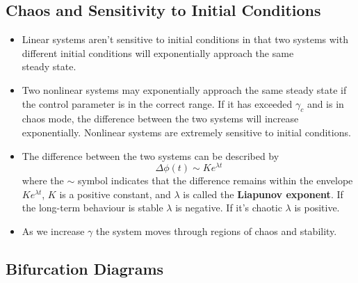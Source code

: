 \documentclass{article}
\begin{document}
\subsection{Chaos and Sensitivity to Initial Conditions}

\begin{itemize}
  \item Linear systems aren't sensitive to initial conditions in that two systems with different initial conditions will exponentially approach the same \\ steady state.

  \item Two nonlinear systems may exponentially approach the same steady state if the control parameter is in the correct range. If it has exceeded $\gamma_c$ and is in chaos mode, the difference between the two systems will increase exponentially. Nonlinear systems are extremely sensitive to initial conditions.

  \item The difference between the two systems can be described by \[\Delta \phi(t) \sim K e^{\lambda t}\] where the $\sim$ symbol indicates that the difference remains within the envelope $K e^{\lambda t}$, $K$ is a positive constant, and $\lambda$ is called the \textbf{Liapunov exponent}. If the long-term behaviour is stable $\lambda$ is negative. If it's chaotic $\lambda$ is positive.

  \item As we increase $\gamma$ the system moves through regions of chaos and stability.
\end{itemize}

\subsection{Bifurcation Diagrams}
\end{document}
